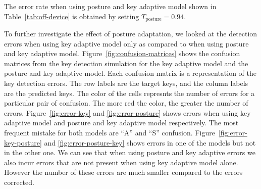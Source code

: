 \documentclass{sigchi}
\begin{document}
The error rate when using posture and key adaptive model shown in Table~\ref{tab:off-device}
is obtained by setting $T_{\text{posture}} = 0.94$.

To further investigate the effect of posture adaptation, we looked at the detection
errors when using key adaptive model only as compared to when using posture and key adaptive model.
Figure~\ref{fig:confusion-matrices} shows the confusion matrices from the key detection
simulation for the key adaptive model and the posture and key adaptive model. Each 
confusion matrix is a representation of the key detection errors. The row labels are
the target keys, and the column labels are the predicted keys. The color of the cells
represnts the number of errors for a particular pair of confusion. The more red the color,
the greater the number of errors. Figure~\ref{fig:error-key} and \ref{fig:error-posture}
shows errors when using key adaptive model and posture and key adaptive model respectively.
The most frequent mistake for both models are ``A'' and ``S'' confusion. Figure~\ref{fig:error-key-posture}
and \ref{fig:error-posture-key} shows errors in one of the models but not in the other one.
We can see that when using posture and key adaptive errors we also incur errors
that are not present when using key adaptive model alone. However the number of these
errors are much smaller compared to the errors corrected.
\end{document}
